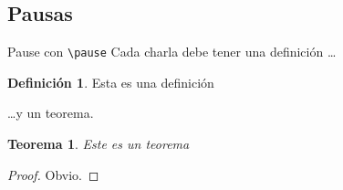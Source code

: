 \documentclass[dvipsnames,xcolor=x11names]{beamer}
\theoremstyle{plain}
\newtheorem{teorema}{Teorema}
\theoremstyle{definition}
\newtheorem{definicion}{Definici\'on}
\begin{document}
\subsection{Pausas}

\begin{frame}{Pause con \texttt{\textbackslash pause}}
   Cada charla debe tener una definici\'on \dots
   \begin{definicion}
      Esta es una definición
   \end{definicion}
   \pause
   \dots y un teorema.
   \begin{teorema}
      Este es un teorema
   \end{teorema}
   \pause
   \begin{proof}
      Obvio.
   \end{proof}

\end{frame}
\end{document}
